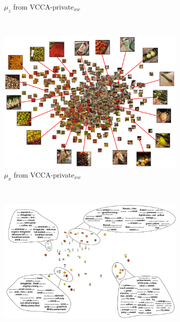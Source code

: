 \begin{figure}[!tp]
\begin{subfigure}[b]{0.49\textwidth}
         \vspace{-4mm}
         \caption{$\mu_{z}$ from VCCA-private$_{x w}$}
         \label{fig:pca_vcca_private_xw_z}
     \end{subfigure} \\[1mm]
     \begin{subfigure}[b]{0.6\textwidth}
         \centering
         \includegraphics[width=\textwidth]{PaperB/figures_and_tables/private_latent_space_visualizations/vcca_private_ux_space.pdf}
         \caption{$\mu_{x}$ from VCCA-private$_{x w}$}
         \label{fig:pca_vcca_private_xw_ux}
     \end{subfigure} \\[1mm]
     \begin{subfigure}[b]{0.7\textwidth}
         \centering
         \includegraphics[width=\textwidth]{PaperB/figures_and_tables/private_latent_space_visualizations/vcca_private_uw_space.pdf}

\end{subfigure}
\end{figure}
